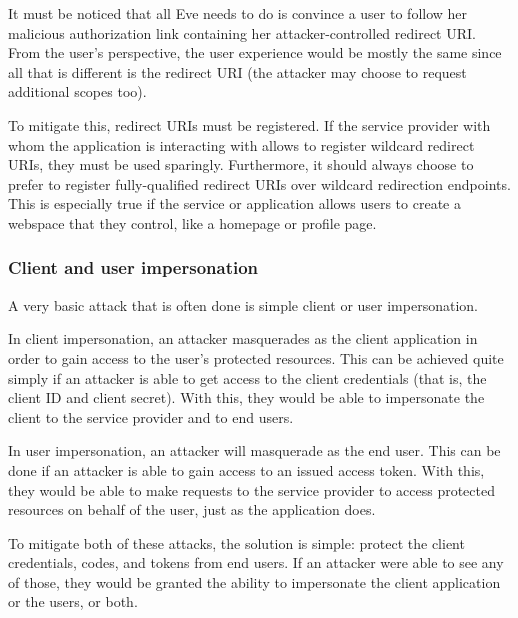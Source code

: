 It must be noticed that all Eve needs to do is convince a user to follow her malicious authorization link containing her attacker-controlled redirect URI. From the user's perspective, the user experience would be mostly the same since all that is different is the redirect URI (the attacker may choose to request additional scopes too).

To mitigate this, redirect URIs must be registered. If the service provider with whom the application is interacting with allows to register wildcard redirect URIs, they must be used sparingly. Furthermore, it should always choose to prefer to register fully-qualified redirect URIs over wildcard redirection endpoints. This is especially true if the service or application allows users to create a webspace that they control, like a homepage or profile page.

\subsubsection{Client and user impersonation}
A very basic attack that is often done is simple client or user impersonation.

In client impersonation, an attacker masquerades as the client application in order to gain access to the user's protected resources. This can be achieved quite simply if an attacker is able to get access to the client credentials (that is, the client ID and client secret). With this, they would be able to impersonate the client to the service provider and to end users.

In user impersonation, an attacker will masquerade as the end user. This can be done if an attacker is able to gain access to an issued access token. With this, they would be able to make requests to the service provider to access protected resources on behalf of the user, just as the application does.

To mitigate both of these attacks, the solution is simple: protect the client credentials, codes, and tokens from end users. If an attacker were able to see any of those, they would be granted the ability to impersonate the client application or the users, or both.


